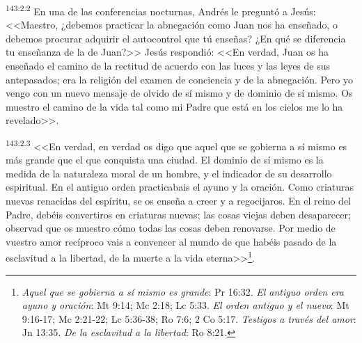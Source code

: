 \par 
\textsuperscript{143:2.2} En una de las conferencias nocturnas, Andrés le preguntó a Jesús: <<Maestro, ¿debemos practicar la abnegación como Juan nos ha enseñado, o debemos procurar adquirir el autocontrol que tú enseñas? ¿En qué se diferencia tu enseñanza de la de Juan?>> Jesús respondió: <<En verdad, Juan os ha enseñado el camino de la rectitud de acuerdo con las luces y las leyes de sus antepasados; era la religión del examen de conciencia y de la abnegación. Pero yo vengo con un nuevo mensaje de olvido de sí mismo y de dominio de sí mismo. Os muestro el camino de la vida tal como mi Padre que está en los cielos me lo ha revelado>>.

\par 
\textsuperscript{143:2.3} <<En verdad, en verdad os digo que aquel que se gobierna a sí mismo es más grande que el que conquista una ciudad. El dominio de sí mismo es la medida de la naturaleza moral de un hombre, y el indicador de su desarrollo espiritual. En el antiguo orden practicabais el ayuno y la oración. Como criaturas nuevas renacidas del espíritu, se os enseña a creer y a regocijaros. En el reino del Padre, debéis convertiros en criaturas nuevas; las cosas viejas deben desaparecer; observad que os muestro cómo todas las cosas deben renovarse. Por medio de vuestro amor recíproco vais a convencer al mundo de que habéis pasado de la esclavitud a la libertad, de la muerte a la vida eterna>>\footnote{\textit{Aquel que se gobierna a sí mismo es grande}: Pr 16:32. \textit{El antiguo orden era ayuno y oración}: Mt 9:14; Mc 2:18; Lc 5:33. \textit{El orden antiguo y el nuevo}: Mt 9:16-17; Mc 2:21-22; Lc 5:36-38; Ro 7:6; 2 Co 5:17. \textit{Testigos a través del amor}: Jn 13:35. \textit{De la esclavitud a la libertad}: Ro 8:21.}.

